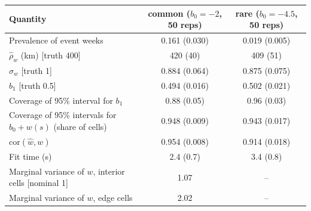 \begin{tabular}{@{}lcc@{}}
\toprule
Quantity & common ($b_0=-2$, 50 reps) & rare ($b_0=-4.5$, 50 reps) \\
\midrule
Prevalence of event weeks & 0.161 (0.030) & 0.019 (0.005) \\
$\hat\rho_w$ (km) [truth 400] & 420 (40) & 409 (51) \\
$\hat\sigma_w$ [truth 1] & 0.884 (0.064) & 0.875 (0.075) \\
$\hat b_1$ [truth 0.5] & 0.494 (0.016) & 0.502 (0.021) \\
Coverage of 95\% interval for $b_1$ & 0.88 (0.05) & 0.96 (0.03) \\
Coverage of 95\% intervals for $b_0 + w(s)$ (share of cells) & 0.948 (0.009) & 0.943 (0.017) \\
$\mathrm{cor}(\hat w, w)$ & 0.954 (0.008) & 0.914 (0.018) \\
Fit time (s) & 2.4 (0.7) & 3.4 (0.8) \\
Marginal variance of $w$, interior cells [nominal 1] & 1.07 & -- \\
Marginal variance of $w$, edge cells & 2.02 & -- \\
\bottomrule
\end{tabular}
